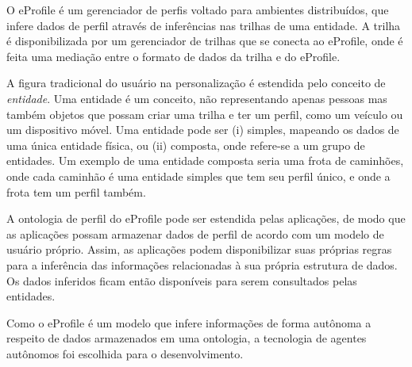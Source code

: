 O eProfile é um gerenciador de perfis voltado para ambientes distribuídos, que infere dados de perfil através de inferências nas trilhas de uma entidade. A trilha é disponibilizada por um gerenciador de trilhas que se conecta ao eProfile, onde é feita uma mediação entre o formato de dados da trilha e do eProfile.

A figura tradicional do usuário na personalização é estendida pelo conceito de \emph{entidade}. Uma entidade é um conceito, não representando apenas pessoas mas também objetos que possam criar uma trilha e ter um perfil, como um veículo ou um dispositivo móvel. Uma entidade pode ser (i) simples, mapeando os dados de uma única entidade física, ou (ii) composta, onde refere-se a um grupo de entidades. Um exemplo de uma entidade composta seria uma frota de caminhões, onde cada caminhão é uma entidade simples que tem seu perfil único, e onde a frota tem um perfil também.

A ontologia de perfil do eProfile pode ser estendida pelas aplicações, de modo que as aplicações possam armazenar dados de perfil de acordo com um modelo de usuário próprio. Assim, as aplicações podem disponibilizar suas próprias regras para a inferência das informações relacionadas à sua própria estrutura de dados. Os dados inferidos ficam então disponíveis para serem consultados pelas entidades.

Como o eProfile é um modelo que infere informações de forma autônoma a respeito de dados armazenados em uma ontologia, a tecnologia de agentes autônomos foi escolhida para o desenvolvimento.
